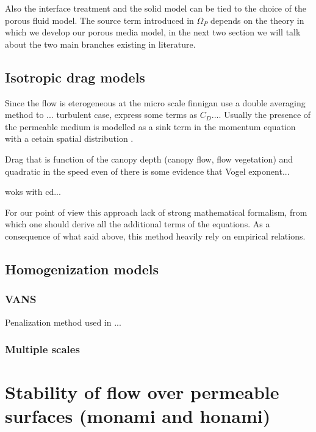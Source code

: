 Also the interface treatment and the solid model can be tied to the choice of the porous fluid model.
The source term introduced in $\Omega_{P}$ depends on the theory in which we develop our porous media model, in the next two section we will talk about the two main  branches existing in literature.

\subsection{Isotropic drag models}
\label{sec:canopy_eq}

Since the flow is eterogeneous at the micro scale finnigan use a double averaging method to ... turbulent case, express some terms as $C_D$....
Usually the presence of the permeable medium is modelled as a sink term in the momentum equation with a cetain spatial distribution .

Drag that is function of the canopy depth (canopy flow, flow vegetation) and quadratic in the speed even of there is some evidence that Vogel exponent...

\citet{maza2013coupled} woks with cd...

For our point of view this approach lack of strong mathematical formalism, from which one should derive all the additional terms of the equations.
As a consequence of what said above, this method heavily rely on empirical relations.


\subsection{Homogenization models}


\subsubsection{VANS}
\label{sec:vans}

Penalization method \citet{angot1999penalization} used in\cite{bruneau2004passive} \cite{bruneau2008numerical} \cite{bruneau2010coupling}...

\subsubsection{Multiple scales}

\section{Stability of flow over permeable surfaces (monami and honami)}
\label{sec:stability}

